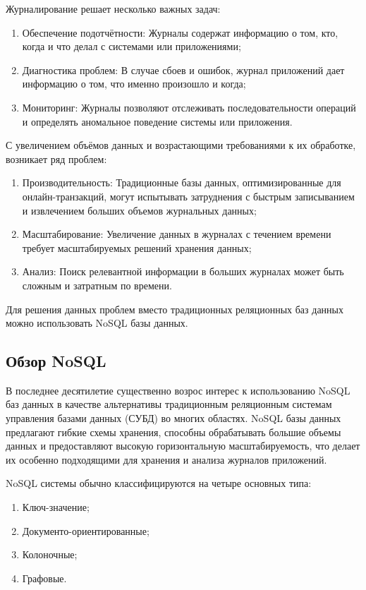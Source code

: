 \documentclass[14pt, russian]{scrartcl}
\begin{document}
Журналирование решает несколько важных задач:

\begin{enumerate}
	\item Обеспечение подотчётности: Журналы содержат информацию о том, кто, когда и что делал с системами или приложениями;
	\item Диагностика проблем: В случае сбоев и ошибок, журнал приложений дает информацию о том, что именно произошло и когда;
	\item Мониторинг: Журналы позволяют отслеживать последовательности операций и определять аномальное поведение системы или приложения.
\end{enumerate}

С увеличением объёмов данных и возрастающими требованиями к их обработке, возникает ряд проблем:

\begin{enumerate}
	\item Производительность: Традиционные базы данных, оптимизированные для онлайн-транзакций, могут испытывать затруднения с быстрым записыванием и извлечением больших объемов журнальных данных;
	\item Масштабирование: Увеличение данных в журналах с течением времени требует масштабируемых решений хранения данных;
	\item Анализ: Поиск релевантной информации в больших журналах может быть сложным и затратным по времени.
\end{enumerate}

Для решения данных проблем вместо традиционных реляционных баз данных можно использовать NoSQL базы данных.

\subsection{Обзор NoSQL}

В последнее десятилетие существенно возрос интерес к использованию NoSQL баз данных в качестве альтернативы традиционным реляционным системам управления базами данных (СУБД) во многих областях. NoSQL базы данных предлагают гибкие схемы хранения, способны обрабатывать большие объемы данных и предоставляют высокую горизонтальную масштабируемость, что делает их особенно подходящими для хранения и анализа журналов приложений.

NoSQL системы обычно классифицируются на четыре основных типа:

\begin{enumerate}
	\item Ключ-значение;
	\item Документо-ориентированные;
	\item Колоночные;
	\item Графовые.
\end{enumerate}
\end{document}
